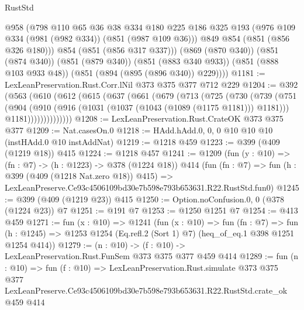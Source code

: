 \begin{lexlean}{RustStd}
\begin{coremodule}
          @958
          (@798
            @110
            @65
            @36
            @38
            @334
            @180
            @225
            @186
            @325
            @193
            (@976 @109 @334 (@981 (@982 @334)) (@851 (@987 @109 @36)))
            @849
            @854
            (@851 (@856 @326 @180)))
          @854
          (@851 (@856 @317 @337)))
        (@869 (@870 @340))
        (@851 (@874 @340))
        (@851 (@879 @340))
        (@851 (@883 @340 @933))
        (@851 (@888 @103 @933 @48))
        (@851 (@894 (@895 (@896 @340)) @229))))
@1181 := LexLeanPreservation.Rust.Corr.lNil @373 @375 @377 @712 @229
@1204 := @392
    (@563
      (@610
        (@612
          (@615
            (@637
              (@661
                (@679
                  (@713
                    (@725
                      (@730
                        (@739
                          (@751
                            (@904
                              (@910
                                (@916 (@1031 (@1037 (@1043 (@1089 (@1175 @1181))) @1181)))
                                @1181))))))))))))))
@1208 := LexLeanPreservation.Rust.CrateOK @373 @375 @377
@1209 := Nat.casesOn.{0}
@1218 := HAdd.hAdd.{0, 0, 0} @10 @10 @10 (instHAdd.{0} @10 instAddNat)
@1219 := @1218 @459
@1223 := @399 (@409 (@1219 @18)) @415
@1224 := @1218 @457
@1241 := @1209
    (fun (y : @10) => (fn : @7) -> (h : @1223) -> @378 (@1224 @18))
    @414
    (fun (fn : @7) =>
    fun (h : @399 (@409 (@1218 Nat.zero @18)) @415) =>
    LexLeanPreserve.Ce93c4506109bd30e7b598e793b653631.R22.RustStd.fun0)
@1245 := @399 (@409 (@1219 @23)) @415
@1250 := Option.noConfusion.{0, 0} (@378 (@1224 @23)) @7
@1251 := @191 @7
@1253 := @1250 @1251 @7
@1254 := @413 @459
@1271 := fun (x : @10) =>
  @1241
    (fun (x : @10) =>
    fun (fn : @7) =>
    fun (h : @1245) => @1253 @1254 (Eq.refl.{2} (Sort 1) @7) (heq_of_eq.{1} @398 @1251 @1254 @414))
@1279 := (n : @10) -> (f : @10) -> LexLeanPreservation.Rust.FunSem @373 @375 @377 @459 @414
@1289 := fun (n : @10) =>
  fun (f : @10) =>
  LexLeanPreservation.Rust.simulate
    @373
    @375
    @377
    LexLeanPreserve.Ce93c4506109bd30e7b598e793b653631.R22.RustStd.crate_ok
    @459
    @414
\end{coremodule}
\end{lexlean}
